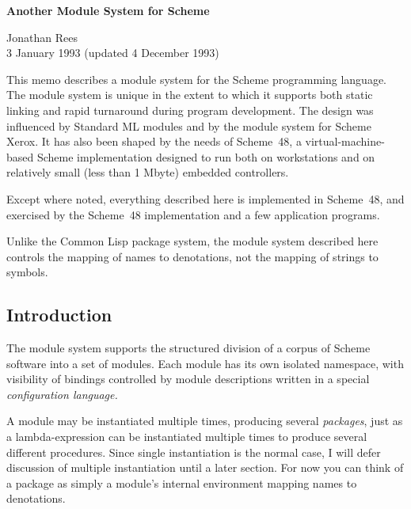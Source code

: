 



\newcommand{\goesto}{\hbox{$\longrightarrow$}}
\newcommand{\alt}{$\vert$}
\newcommand{\arbno}[1]{{{#1}$^*$}}
\newcommand{\hack}{Scheme~48}



\begin{center}
{\Large\bf Another Module System for Scheme}

\vspace{2ex}
Jonathan Rees \\
3 January 1993 (updated 4 December 1993)
\end{center}

\vspace{3ex}

This memo describes a module system for the Scheme programming
language.  The module system is unique in the extent to which it
supports both static linking and rapid turnaround during program
development.  The design was influenced by Standard ML
modules\cite{MacQueen:Modules} and by the module system for Scheme
Xerox\cite{Curtis-Rauen:Modules}.  It has also been shaped by the
needs of \hack{}, a virtual-machine-based Scheme implementation
designed to run both on workstations and on relatively small (less
than 1 Mbyte) embedded controllers.

Except where noted, everything described here is implemented in
\hack{}, and exercised by the \hack{} implementation and a few
application programs.

Unlike the Common Lisp package system, the module system described
here controls the mapping of names to denotations, not the
mapping of strings to symbols.


\subsection*{Introduction}

The module system supports the structured division of a corpus of
Scheme software into a set of modules.  Each module has its own
isolated namespace, with visibility of bindings controlled by module
descriptions written in a special {\em configuration language.}

A module may be instantiated multiple times, producing several {\em
packages}, just as a lambda-expression can be instantiated multiple
times to produce several different procedures.  Since single
instantiation is the normal case, I will defer discussion of multiple
instantiation until a later section.  For now you can think of a
package as simply a module's internal environment mapping names to
denotations.

